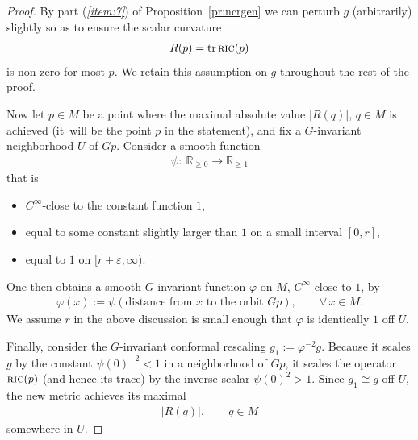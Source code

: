 \documentclass[10pt,a4paper]{amsart}
\numberwithin{equation}{section}
\newcommand{\cat}[1]{\textsc{#1}}
\begin{document}
\begin{proof}
 By part ({\it \ref{item:7}}) of Proposition~\ref{pr:ncrgen} we can perturb $g$ (arbitrarily) slightly so as to ensure the scalar curvature
 \begin{gather*}
 R(p) = \operatorname{tr} \cat{ric}(p)
 \end{gather*}
 is non-zero for most $p$. We retain this assumption on $g$ throughout the rest of the proof.

 Now let $p\in M$ be a point where the maximal absolute value $|R(q)|$, $q\in M$ is achieved (it~will be the point $p$ in the statement), and fix a $G$-invariant neighborhood $U$ of $Gp$. %
 Consider a smooth function
 \begin{gather*}
 \psi\colon\ \mathbb{R}_{\ge 0}\to \mathbb{R}_{\ge 1}
 \end{gather*}
 that is
 \begin{itemize}\itemsep=0pt
 \item $C^{\infty}$-close to the constant function $1$,
 \item equal to some constant slightly larger than $1$ on a small interval $[0,r]$,
 \item equal to $1$ on $[r+\varepsilon,\infty)$.
 \end{itemize}
 One then obtains a smooth $G$-invariant function $\varphi$ on $M$, $C^{\infty}$-close to $1$, by
 \begin{gather*}
 \varphi(x):=\psi(\text{distance from $x$ to the orbit $Gp$}),\qquad \forall\, x\in M.
 \end{gather*}
 We assume $r$ in the above discussion is small enough that $\varphi$ is identically $1$ off $U$.

 Finally, consider the $G$-invariant conformal rescaling $g_1:=\varphi^{-2} g$. Because it scales $g$ by the constant $\psi(0)^{-2}<1$ in a neighborhood of $Gp$, it scales the operator $\cat{ric}(p)$ (and hence its trace) by the inverse scalar $\psi(0)^2>1$. Since $g_1\cong g$ off $U$, the new metric achieves its maximal
 \begin{gather}\label{eq:sprric}
 |R(q)|,\qquad q\in M
 \end{gather}
 somewhere in $U$.


\end{proof}
\end{document}
